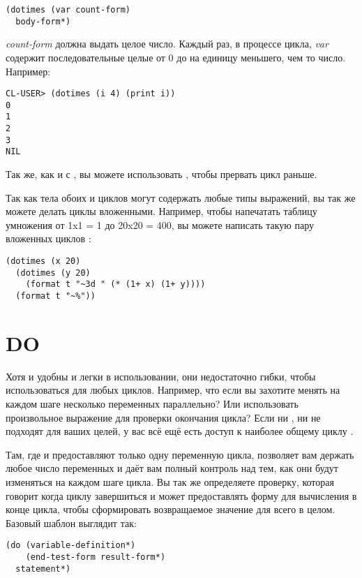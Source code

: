 \begin{lstlisting}
(dotimes (var count-form)
  body-form*)
\end{lstlisting}

\textit{count-form} должна выдать целое число. Каждый раз, в процессе цикла, \textit{var}
содержит последовательные целые от 0 до на единицу меньшего, чем то число.  Например:

\begin{lstlisting}
CL-USER> (dotimes (i 4) (print i))
0
1
2
3
NIL
\end{lstlisting}

Так же, как и с , вы можете использовать , чтобы прервать цикл
раньше.

Так как тела обоих  и  циклов могут содержать любые типы
выражений, вы так же можете делать циклы вложенными. Например, чтобы напечатать таблицу
умножения от 1x1 = 1 до 20x20 = 400, вы можете написать такую пару вложенных циклов
:

\begin{lstlisting}
(dotimes (x 20)
  (dotimes (y 20)
    (format t "~3d " (* (1+ x) (1+ y))))
  (format t "~%"))
\end{lstlisting}

\section{DO}

Хотя  и  удобны и легки в использовании, они недостаточно
гибки, чтобы использоваться для любых циклов. Например, что если вы захотите менять на
каждом шаге несколько переменных параллельно? Или использовать произвольное выражение для
проверки окончания цикла? Если ни , ни  не подходят для ваших
целей, у вас всё ещё есть доступ к наиболее общему циклу .

Там, где  и  предоставляют только одну переменную цикла,
 позволяет вам держать любое число переменных и даёт вам полный контроль над тем,
как они будут изменяться на каждом шаге цикла. Вы так же определяете проверку, которая
говорит когда циклу завершиться и может предоставлять форму для вычисления в конце цикла,
чтобы сформировать возвращаемое значение для всего  в целом. Базовый шаблон
выглядит так:

\begin{lstlisting}
(do (variable-definition*)
    (end-test-form result-form*)
  statement*)
\end{lstlisting}

